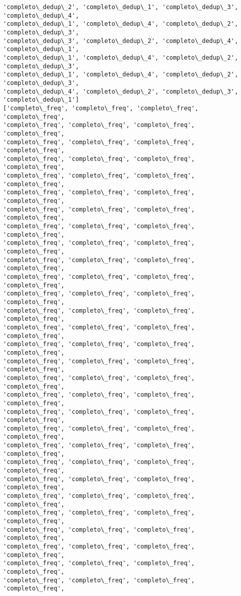 \documentclass[11pt]{article}
\begin{document}
\begin{Verbatim}[commandchars=\\\{\}]
'completo\_dedup\_2', 'completo\_dedup\_1', 'completo\_dedup\_3', 'completo\_dedup\_4',
'completo\_dedup\_1', 'completo\_dedup\_4', 'completo\_dedup\_2', 'completo\_dedup\_3',
'completo\_dedup\_3', 'completo\_dedup\_2', 'completo\_dedup\_4', 'completo\_dedup\_1',
'completo\_dedup\_1', 'completo\_dedup\_4', 'completo\_dedup\_2', 'completo\_dedup\_3',
'completo\_dedup\_1', 'completo\_dedup\_4', 'completo\_dedup\_2', 'completo\_dedup\_3',
'completo\_dedup\_4', 'completo\_dedup\_2', 'completo\_dedup\_3', 'completo\_dedup\_1']
['completo\_freq', 'completo\_freq', 'completo\_freq', 'completo\_freq',
'completo\_freq', 'completo\_freq', 'completo\_freq', 'completo\_freq',
'completo\_freq', 'completo\_freq', 'completo\_freq', 'completo\_freq',
'completo\_freq', 'completo\_freq', 'completo\_freq', 'completo\_freq',
'completo\_freq', 'completo\_freq', 'completo\_freq', 'completo\_freq',
'completo\_freq', 'completo\_freq', 'completo\_freq', 'completo\_freq',
'completo\_freq', 'completo\_freq', 'completo\_freq', 'completo\_freq',
'completo\_freq', 'completo\_freq', 'completo\_freq', 'completo\_freq',
'completo\_freq', 'completo\_freq', 'completo\_freq', 'completo\_freq',
'completo\_freq', 'completo\_freq', 'completo\_freq', 'completo\_freq',
'completo\_freq', 'completo\_freq', 'completo\_freq', 'completo\_freq',
'completo\_freq', 'completo\_freq', 'completo\_freq', 'completo\_freq',
'completo\_freq', 'completo\_freq', 'completo\_freq', 'completo\_freq',
'completo\_freq', 'completo\_freq', 'completo\_freq', 'completo\_freq',
'completo\_freq', 'completo\_freq', 'completo\_freq', 'completo\_freq',
'completo\_freq', 'completo\_freq', 'completo\_freq', 'completo\_freq',
'completo\_freq', 'completo\_freq', 'completo\_freq', 'completo\_freq',
'completo\_freq', 'completo\_freq', 'completo\_freq', 'completo\_freq',
'completo\_freq', 'completo\_freq', 'completo\_freq', 'completo\_freq',
'completo\_freq', 'completo\_freq', 'completo\_freq', 'completo\_freq',
'completo\_freq', 'completo\_freq', 'completo\_freq', 'completo\_freq',
'completo\_freq', 'completo\_freq', 'completo\_freq', 'completo\_freq',
'completo\_freq', 'completo\_freq', 'completo\_freq', 'completo\_freq',
'completo\_freq', 'completo\_freq', 'completo\_freq', 'completo\_freq',
'completo\_freq', 'completo\_freq', 'completo\_freq', 'completo\_freq',
'completo\_freq', 'completo\_freq', 'completo\_freq', 'completo\_freq',
'completo\_freq', 'completo\_freq', 'completo\_freq', 'completo\_freq',
'completo\_freq', 'completo\_freq', 'completo\_freq', 'completo\_freq',
'completo\_freq', 'completo\_freq', 'completo\_freq', 'completo\_freq',

\end{Verbatim}
\end{document}
